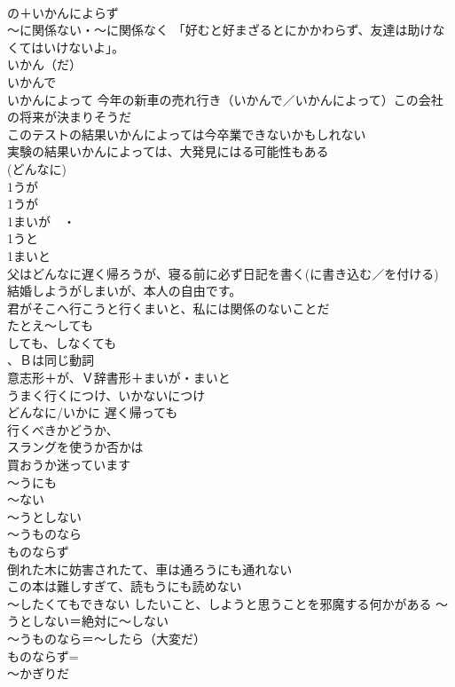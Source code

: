 \documentclass[8pt]{extreport}
\begin{document}
\begin{CJK}{UTF8}{min}
\\	の＋いかんによらず 
\\	～に関係ない・～に関係なく 「好むと好まざるとにかかわらず、友達は助けなくてはいけないよ」。 
\\	いかん（だ） 
\\	いかんで 
\\	いかんによって 今年の新車の売れ行き（いかんで／いかんによって）この会社の将来が決まりそうだ 
\\	このテストの結果いかんによっては今卒業できないかもしれない 
\\	実験の結果いかんによっては、大発見にはる可能性もある 
\\	(どんなに) 
\\	1うが　 
\\	1うが 
\\	1まいが　・　
\\	1うと 
\\	1まいと 
\\	父はどんなに遅く帰ろうが、寝る前に必ず日記を書く(に書き込む／を付ける) 
\\	結婚しようがしまいが、本人の自由です。 
\\	君がそこへ行こうと行くまいと、私には関係のないことだ 
\\	たとえ～しても　
\\	しても、しなくても 
\\	、Ｂは同じ動詞　
\\	意志形＋が、Ｖ辞書形＋まいが・まいと	
\\	うまく行くにつけ、いかないにつけ 
\\	どんなに/いかに 遅く帰っても
\\	行くべきかどうか、
\\	スラングを使うか否かは 
\\	買おうか迷っています 
\\	～うにも 
\\	～ない 
\\	～うとしない 
\\	～うものなら 
\\	ものならず	
\\	倒れた木に妨害されたて、車は通ろうにも通れない 
\\	この本は難しすぎて、読もうにも読めない 
\\	～したくてもできない したいこと、しようと思うことを邪魔する何かがある	～うとしない＝絶対に～しない 
\\	～うものなら＝～したら（大変だ） 
\\	ものならず=
\\	～かぎりだ 

\end{CJK}
\end{document}
